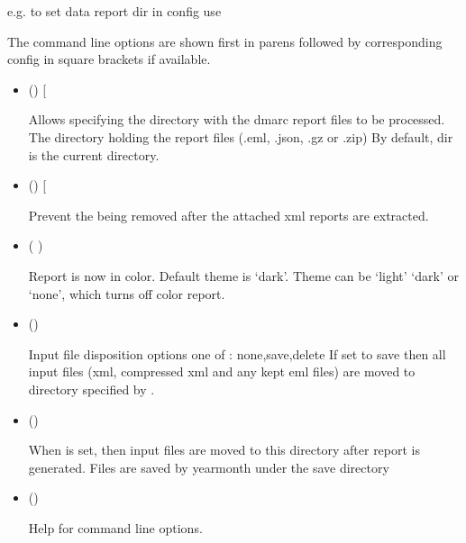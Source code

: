 \documentclass[letterpaper,10pt,english]{sphinxmanual}
\begin{document}
\sphinxAtStartPar
e.g. to set data report dir in config use

\begin{sphinxVerbatim}[commandchars=\\\{\}]
  
\end{sphinxVerbatim}

\sphinxAtStartPar
The command line options are shown first in parens followed by
corresponding config in square brackets if available.
\begin{itemize}
\item {} 
\sphinxAtStartPar
() {[}\sphinxstyleemphasis{dir = /some/path}{]}

\sphinxAtStartPar
Allows specifying the directory with the dmarc report files to be processed.
The directory holding the report files (.eml, .json, .gz or .zip)
By default, dir is the current directory.

\item {} 
\sphinxAtStartPar
() {[}\sphinxstyleemphasis{keep = true}{]}

\sphinxAtStartPar
Prevent the  being removed after the attached xml reports are extracted.

\item {} 
\sphinxAtStartPar
( )

\sphinxAtStartPar
Report is now in color.
Default theme is ‘dark’. Theme can be ‘light’ ‘dark’ or ‘none’, which turns off color report.

\item {} 
\sphinxAtStartPar
()

\sphinxAtStartPar
Input file disposition options one of : none,save,delete
If set to save then all input files (xml, compressed xml and any kept eml files) are moved
to directory specified by .

\item {} 
\sphinxAtStartPar
()

\sphinxAtStartPar
When  is set, then input files are moved to this directory after report
is generated.  Files are saved by year\sphinxhyphen{}month under the save directory

\item {} 
\sphinxAtStartPar
()

\sphinxAtStartPar
Help for command line options.

\end{itemize}
\end{document}

